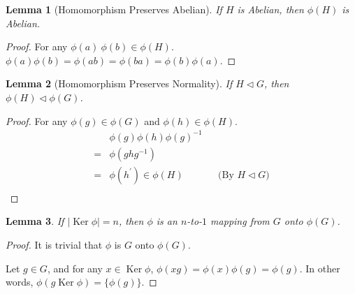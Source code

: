 \documentclass[14pt]{extarticle}
\newtheorem{lemma}{Lemma}[section]
\DeclareMathOperator{\Ker}{Ker}
\newcommand{\inv}[1]{#1^{-1}}
\newcommand{\normalin}{\triangleleft}
\newcommand{\1}{\{e\}}
\begin{document}
\begin{lemma}[Homomorphism Preserves Abelian]
  If $H$ is Abelian, then $\phi(H)$ is Abelian.
\end{lemma}
\begin{proof}
  For any $\phi(a) \ \phi(b) \in \phi(H)$.
  $\phi(a)\phi(b) = \phi(ab) = \phi(ba) = \phi(b)\phi(a)$.
\end{proof}

\begin{lemma}[Homomorphism Preserves Normality]
  If $H \normalin G$, then $\phi(H) \normalin \phi(G)$.
\end{lemma}
\begin{proof}
  For any $\phi(g) \in \phi(G)$ and $\phi(h) \in \phi(H)$.
  \begin{align*}
     & \phi(g)\phi(h)\inv{\phi(g)} \\
    =& \phi(gh\inv{g}) \\
    =& \phi(h^\prime) \in \phi(H) && \text{(By $H \normalin G$)} \\
  \end{align*}
\end{proof}

\begin{lemma}
  If $|\Ker \phi| = n$, then $\phi$ is an $n$-to-$1$ mapping from $G$ onto $\phi(G)$.
\end{lemma}
\begin{proof}
  It is trivial that $\phi$ is $G$ onto $\phi(G)$.

  Let $g \in G$, and for any $x \in \Ker \phi$, $\phi(xg) = \phi(x)\phi(g) = \phi(g)$.
  In other words, $\phi(g \Ker \phi) = \{ \phi(g) \}$.
\end{proof}
\end{document}
